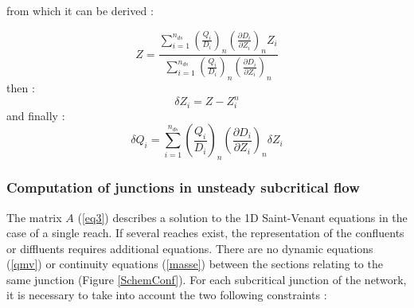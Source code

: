 from which it can be derived :

\begin{equation}
  Z = \frac{\displaystyle \sum_{i=1}^{n_{ds}} \left ( \frac{Q_i}{D_i} \right )_n \left ( \frac{\partial D_i}{\partial Z_i} \right )_n Z_i}{\displaystyle \sum_{i=1}^{n_{ds}} \left ( \frac{Q_i}{D_i} \right )_n \left ( \frac{\partial D_i}{\partial Z_i} \right )_n}
\end{equation}
then :
\begin{equation}
  \delta Z_i = Z - Z_{i}^n
\end{equation}
and finally :
\begin{equation}
  \delta Q_i = \sum_{i=1}^{n_{ds}} \left ( \frac{Q_i}{D_i} \right )_n \left ( \frac{\partial D_i}{\partial Z_i} \right )_n \delta Z_i
\end{equation}


\subsubsection{Computation of junctions in unsteady subcritical flow} \label{NDRezo}

The matrix $A$ (\ref{eq3}) describes a solution to the 1D Saint-Venant equations in the case of a single reach. If several reaches exist, the representation of the confluents or diffluents requires additional equations. There are no dynamic equations (\ref{qmv}) or continuity equations (\ref{masse}) between the sections relating to the same junction (Figure \ref{SchemConf}). For each subcritical junction of the network, it is necessary to take into account the two following constraints :

